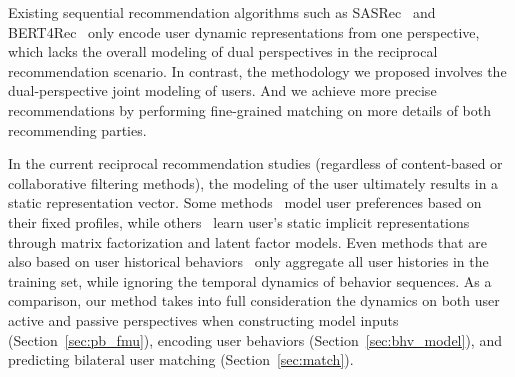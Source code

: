 Existing sequential recommendation algorithms such as SASRec~\cite{kang2018self} and BERT4Rec~\cite{sun2019bert4rec} only encode user dynamic representations from one perspective, which lacks the overall modeling of dual perspectives in the reciprocal recommendation scenario. In contrast, the methodology we proposed involves the dual-perspective joint modeling of users. And we achieve more precise recommendations by performing fine-grained matching on more details of both recommending parties.

In the current reciprocal recommendation studies (regardless of content-based or collaborative filtering methods), the modeling of the user ultimately results in a static representation vector. 
Some methods~\cite{pizzato2010recon,yildirim2021bideepfm} model user preferences based on their fixed profiles, while others~\cite{rendle2009bpr,neve2019latent} learn user's static implicit representations through matrix factorization and latent factor models. 
Even methods that are also based on user historical behaviors~\cite{fu2021beyond} only aggregate all user histories in the training set, while ignoring the temporal dynamics of behavior sequences. 
As a comparison, our method takes into full consideration the dynamics on both user active and passive perspectives when constructing model inputs (Section~\ref{sec:pb_fmu}), encoding user behaviors (Section~\ref{sec:bhv_model}), and predicting bilateral user matching (Section~\ref{sec:match}).











